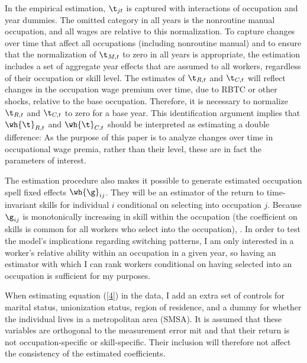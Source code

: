 \documentclass[12pt]{article}
\newcommand{\highlightP}[1]{{\emph{\color{MyPink}{#1}}}}
\theoremstyle{definition}
\begin{document}
In the empirical estimation, $\t_{jt}$ is captured with interactions of occupation and year dummies. The omitted category in all years is the nonroutine manual occupation, and all wages are relative to this normalization. To capture changes over time that affect all occupations (including nonroutine manual) and to ensure that the normalization of $\t_{M, t}$ to zero in all years is appropriate, the estimation includes a set of aggregate year effects that are assumed to all workers, regardless of their occupation or skill level. The estimates of $\t_{R,t}$ and $\t_{C,t}$ will reflect changes in the occupation wage premium over time, due to RBTC or other shocks, relative to the base occupation. \highlightP{Because of the inclusion of the occupation spell fixed effects, the occupation-time fixed effects are identified only from variation over time within occupation spells.} Therefore, it is necessary to normalize $\t_{R, t}$ and $\t_{C,t}$ to zero for a base year. This identification argument implies that $\wh{\t}_{R, t}$ and $\wh{\t}_{C, t}$ should be interpreted as estimating a double difference: \highlightP{rather than identifying the level of the occupation wage premia, they identify their changes over time relative to the base year and relative to the analogous change experienced by the base occupation (nonroutine manual).} As the purpose of this paper is to analyze changes over time in occupational wage premia, rather than their level, these are in fact the parameters of interest.

The estimation procedure also makes it possible to generate estimated occupation spell fixed effects $\wh{\g}_{ij}$. They will be an estimator of the return to time-invariant skills for individual $i$ conditional on selecting into occupation $j$. Because $\g_{ij}$ is monotonically increasing in skill within the occupation (the coefficient on skills is common for all workers who select into the occupation), \highlightP{the ranking of workers according to this measure corresponds to their ranking according to their underlying ability}. In order to test the model's implications regarding switching patterns, I am only interested in a worker's relative ability within an occupation in a given year, so having an estimator with which I can rank workers conditional on having selected into an occupation is sufficient for my purposes.

When estimating equation (\ref{4}) in the data, I add an extra set of controls for marital status, unionization status, region of residence, and a dummy for whether the individual lives in a metropolitan area (SMSA). It is assumed that these variables are orthogonal to the measurement error mit and that their return is not occupation-specific or skill-specific. Their inclusion will therefore not affect the consistency of the estimated coefficients.
\end{document}
